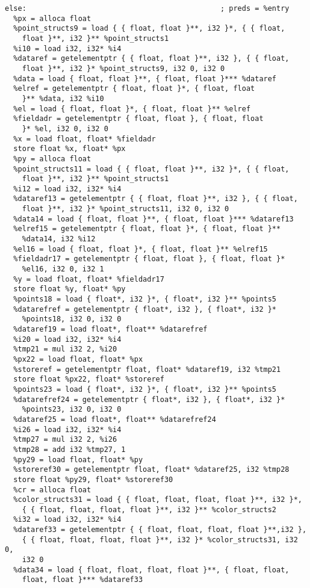 \documentclass[main.tex]{subfiles}
\begin{document}
{\begin{lstlisting}
else:                                             ; preds = %entry
  %px = alloca float
  %point_structs9 = load { { float, float }**, i32 }*, { { float,
    float }**, i32 }** %point_structs1
  %i10 = load i32, i32* %i4
  %dataref = getelementptr { { float, float }**, i32 }, { { float,
    float }**, i32 }* %point_structs9, i32 0, i32 0
  %data = load { float, float }**, { float, float }*** %dataref
  %elref = getelementptr { float, float }*, { float, float 
    }** %data, i32 %i10
  %el = load { float, float }*, { float, float }** %elref
  %fieldadr = getelementptr { float, float }, { float, float
    }* %el, i32 0, i32 0
  %x = load float, float* %fieldadr
  store float %x, float* %px
  %py = alloca float
  %point_structs11 = load { { float, float }**, i32 }*, { { float, 
    float }**, i32 }** %point_structs1
  %i12 = load i32, i32* %i4
  %dataref13 = getelementptr { { float, float }**, i32 }, { { float, 
    float }**, i32 }* %point_structs11, i32 0, i32 0
  %data14 = load { float, float }**, { float, float }*** %dataref13
  %elref15 = getelementptr { float, float }*, { float, float }**
    %data14, i32 %i12
  %el16 = load { float, float }*, { float, float }** %elref15
  %fieldadr17 = getelementptr { float, float }, { float, float }*
    %el16, i32 0, i32 1
  %y = load float, float* %fieldadr17
  store float %y, float* %py
  %points18 = load { float*, i32 }*, { float*, i32 }** %points5
  %datarefref = getelementptr { float*, i32 }, { float*, i32 }* 
    %points18, i32 0, i32 0
  %dataref19 = load float*, float** %datarefref
  %i20 = load i32, i32* %i4
  %tmp21 = mul i32 2, %i20
  %px22 = load float, float* %px
  %storeref = getelementptr float, float* %dataref19, i32 %tmp21
  store float %px22, float* %storeref
  %points23 = load { float*, i32 }*, { float*, i32 }** %points5
  %datarefref24 = getelementptr { float*, i32 }, { float*, i32 }*
    %points23, i32 0, i32 0
  %dataref25 = load float*, float** %datarefref24
  %i26 = load i32, i32* %i4
  %tmp27 = mul i32 2, %i26
  %tmp28 = add i32 %tmp27, 1
  %py29 = load float, float* %py
  %storeref30 = getelementptr float, float* %dataref25, i32 %tmp28
  store float %py29, float* %storeref30
  %cr = alloca float
  %color_structs31 = load { { float, float, float, float }**, i32 }*,
    { { float, float, float, float }**, i32 }** %color_structs2
  %i32 = load i32, i32* %i4
  %dataref33 = getelementptr { { float, float, float, float }**,i32 },
    { { float, float, float, float }**, i32 }* %color_structs31, i32 0,
    i32 0
  %data34 = load { float, float, float, float }**, { float, float, 
    float, float }*** %dataref33

\end{lstlisting}}
\end{document}

